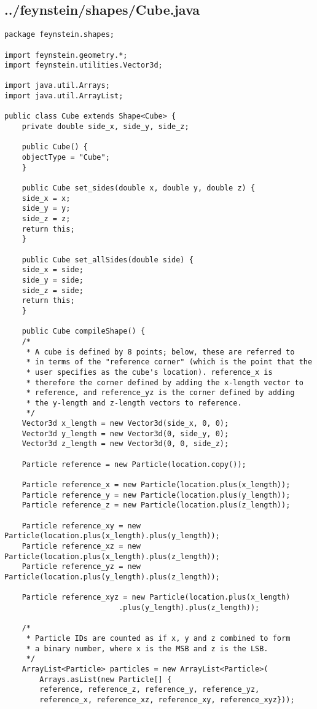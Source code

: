 \subsection*{../feynstein/shapes/Cube.java}
\begin{lstlisting}
package feynstein.shapes;

import feynstein.geometry.*;
import feynstein.utilities.Vector3d;

import java.util.Arrays;
import java.util.ArrayList;

public class Cube extends Shape<Cube> {
    private double side_x, side_y, side_z;

    public Cube() {
	objectType = "Cube";
    }

    public Cube set_sides(double x, double y, double z) {
	side_x = x;
	side_y = y;
	side_z = z;
	return this;
    }

    public Cube set_allSides(double side) {
	side_x = side;
	side_y = side;
	side_z = side;
	return this;
    }

    public Cube compileShape() {
	/*
	 * A cube is defined by 8 points; below, these are referred to
	 * in terms of the "reference corner" (which is the point that the
	 * user specifies as the cube's location). reference_x is
	 * therefore the corner defined by adding the x-length vector to
	 * reference, and reference_yz is the corner defined by adding
	 * the y-length and z-length vectors to reference.
	 */
	Vector3d x_length = new Vector3d(side_x, 0, 0);
	Vector3d y_length = new Vector3d(0, side_y, 0);
	Vector3d z_length = new Vector3d(0, 0, side_z);

	Particle reference = new Particle(location.copy());

	Particle reference_x = new Particle(location.plus(x_length));
	Particle reference_y = new Particle(location.plus(y_length));
	Particle reference_z = new Particle(location.plus(z_length));

	Particle reference_xy = new Particle(location.plus(x_length).plus(y_length));
	Particle reference_xz = new Particle(location.plus(x_length).plus(z_length));
	Particle reference_yz = new Particle(location.plus(y_length).plus(z_length));

	Particle reference_xyz = new Particle(location.plus(x_length)
					      .plus(y_length).plus(z_length));

	/*
	 * Particle IDs are counted as if x, y and z combined to form
	 * a binary number, where x is the MSB and z is the LSB.
	 */
	ArrayList<Particle> particles = new ArrayList<Particle>(
	    Arrays.asList(new Particle[] {
		reference, reference_z, reference_y, reference_yz, 
		reference_x, reference_xz, reference_xy, reference_xyz}));


\end{lstlisting}
